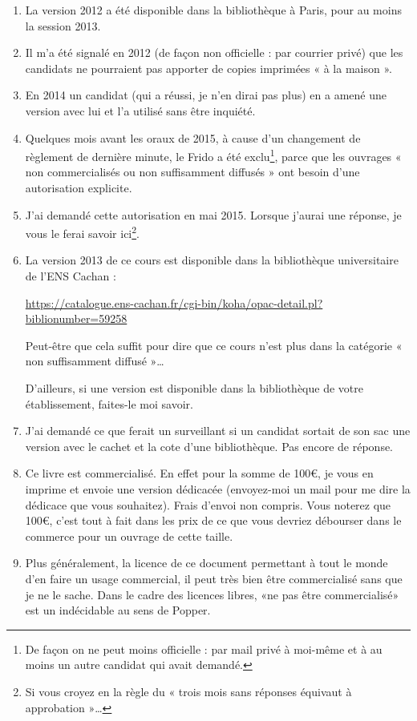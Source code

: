 \begin{enumerate}
    \item
        La version 2012 a été disponible dans la bibliothèque à Paris, pour au moins la session 2013.
    \item 
        Il m'a été signalé en 2012 (de façon non officielle : par courrier privé) que les candidats ne pourraient pas apporter de copies imprimées « à la maison ».
    \item
        En 2014 un candidat (qui a réussi, je n'en dirai pas plus) en a amené une version avec lui et l'a utilisé sans être inquiété.
    \item
        Quelques mois avant les oraux de 2015, à cause d'un changement de règlement de dernière minute, le Frido a été exclu\footnote{De façon on ne peut moins officielle : par mail privé à moi-même et à au moins un autre candidat qui avait demandé.}, parce que les ouvrages « non commercialisés ou non suffisamment diffusés » ont besoin d'une autorisation explicite.
    \item
        J'ai demandé cette autorisation en mai 2015. Lorsque j'aurai une réponse, je vous le ferai savoir ici\footnote{Si vous croyez en la règle du « trois mois sans réponses équivaut à approbation »\ldots}.
    \item
        La version 2013 de ce cours est disponible dans la bibliothèque universitaire de l'ENS Cachan :
        \begin{center}
            \url{https://catalogue.ens-cachan.fr/cgi-bin/koha/opac-detail.pl?biblionumber=59258}
        \end{center}
        Peut-être que cela suffit pour dire que ce cours n'est plus dans la catégorie « non suffisamment diffusé »\ldots

        D'ailleurs, si une version est disponible dans la bibliothèque de votre établissement, faites-le moi savoir.
    \item
        J'ai demandé ce que ferait un surveillant si un candidat sortait de son sac une version avec le cachet et la cote d'une bibliothèque. Pas encore de réponse.
    \item
        Ce livre est commercialisé. En effet pour la somme de 100€, je vous en imprime et envoie une version dédicacée (envoyez-moi un mail pour me dire la dédicace que vous souhaitez). Frais d'envoi non compris. Vous noterez que 100€, c'est tout à fait dans les prix de ce que vous devriez débourser dans le commerce pour un ouvrage de cette taille.
    \item
        Plus généralement, la licence de ce document permettant à tout le monde d'en faire un usage commercial, il peut très bien être commercialisé sans que je ne le sache. Dans le cadre des licences libres, «ne pas être commercialisé» est un indécidable au sens de Popper.
\end{enumerate}

